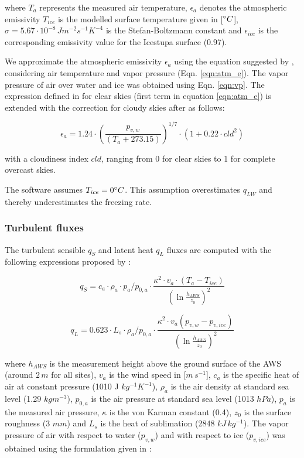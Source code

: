 \documentclass[utf8]{frontiersSCNS}
\begin{document}
where $T_a$ represents the measured air temperature, $\epsilon_a$ denotes the atmospheric emissivity $T_{ice}$
is the modelled surface temperature given in [$\degree C$], $\sigma=5.67\cdot10^{-8}\,Jm^{-2}s^{-1}K^{-4}$ is
the Stefan-Boltzmann constant and $\epsilon_{ice}$ is the corresponding emissivity value for the Icestupa
surface (0.97).

We approximate the atmospheric emissivity $\epsilon_a$ using the equation suggested by \cite{Brutsaert_1975},
considering air temperature and vapor pressure (Eqn. \ref{eqn:atm_e}). The vapor pressure of air over water and
ice was obtained using Eqn. \ref{eqn:vp}.  The expression defined in \cite{Brutsaert_1975} for clear skies
(first term in equation \ref{eqn:atm_e}) is extended with the correction for cloudy skies after
\cite{Brutsaert_1982} as follows:

\begin{equation}
	\epsilon_a=1.24 \cdot (\frac{p_{v,w}}{(T_a+273.15)})^{1/7}\cdot(1+0.22\cdot{cld}^2) \label{eqn:atm_e}
\end{equation}

with a cloudiness index $cld$, ranging from 0 for clear skies to 1 for complete overcast skies. 

The software assumes $T_{ice} = 0 \degree C$. This assumption overestimates $q_{LW}$ and thereby underestimates
the freezing rate.

\subsubsection{Turbulent fluxes} \label{sec:Qs}

The turbulent sensible $q_{S}$ and latent heat $q_{L}$ fluxes are computed with the following expressions
proposed by \cite{Garratt_1992}:

\begin{equation}
	q_{S}= c_{a} \cdot \rho_{a} \cdot p_{a}/p_{0,a} \cdot \frac{\kappa^2 \cdot v_a \cdot
		(T_a-T_{ice})}{{(\ln{\frac{h_{AWS}}{z_{0}}})}^2}
	\label{eqn:qs}
\end{equation}

\begin{equation}
	q_{L}= 0.623 \cdot L_s \cdot \rho_{a}/p_{0,a} \cdot \frac{\kappa^2 \cdot
	v_a(p_{v,w}-p_{v,ice})}{{(\ln{\frac{h_{AWS}}{z_{0}}})}^2}
\end{equation}

where $h_{AWS}$ is the measurement height above the ground surface of the AWS (around $2\,m$ for all sites),
$v_a$ is the wind speed in [$m\,s^{-1}$], $c_a$ is the specific heat of air at constant pressure (1010 J
$kg^{-1} K^{-1}$), $\rho_{a}$ is the air density at standard sea level (1.29 $kg m^{-3}$), $p_{0,a}$ is the air
pressure at standard sea level (1013 $hPa$), $p_{a}$ is the measured air pressure, $\kappa$ is the von Karman
constant (0.4), $z_{0}$ is the surface roughness (3 $mm$) and $L_s$ is the heat of sublimation (2848
$kJ\,kg^{-1}$).  The vapor pressure of air with respect to water ($p_{v,w}$) and with respect to ice
($p_{v,ice}$) was obtained using the formulation given in \cite{huang_2018} :
\end{document}

